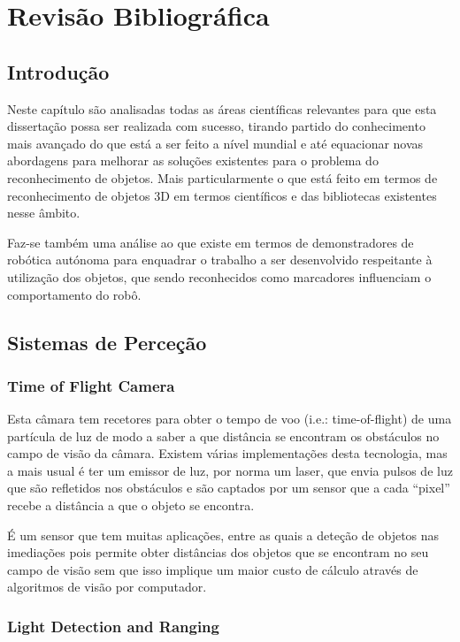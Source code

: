 \chapter{Revisão Bibliográfica} \label{chap:sota}

\section{Introdução}

Neste capítulo são analisadas todas as áreas científicas relevantes para que esta dissertação possa ser realizada com sucesso, tirando partido do conhecimento mais avançado do que está a ser feito a nível mundial e até equacionar novas abordagens para melhorar as soluções existentes para o problema do reconhecimento de objetos. Mais particularmente o que está feito em termos de reconhecimento de objetos 3D em termos científicos e das bibliotecas existentes nesse âmbito.

Faz-se também uma análise ao que existe em termos de demonstradores de robótica autónoma para enquadrar o trabalho a ser desenvolvido respeitante à utilização dos objetos, que sendo reconhecidos como marcadores influenciam o comportamento do robô.

\section{Sistemas de Perceção}

\subsection{Time of Flight Camera}

Esta câmara tem recetores para obter o tempo de voo (i.e.: time-of-flight)
de uma partícula de luz de modo a saber a que distância se encontram os
obstáculos no campo de visão da câmara. Existem várias implementações desta
tecnologia, mas a mais usual é ter um emissor de luz, por norma um laser,
que envia pulsos de luz que são refletidos nos obstáculos e são captados por
um sensor que a cada “pixel” recebe a distância a que o objeto se encontra.

É um sensor que tem muitas aplicações, entre as quais a deteção de objetos nas imediações pois permite obter distâncias dos objetos que se encontram no seu campo de visão sem que isso implique um maior custo de cálculo através de algoritmos de visão por computador. 

\subsection[LIDAR]{Light Detection and Ranging}

